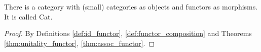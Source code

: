 \begin{theorem}
  There is a category with (small) categories as objects and functors as
  morphisms. It is called Cat.

  \begin{proof}
    By Definitions \ref{def:id_functor}, \ref{def:functor_composition} and Theorems \ref{thm:unitality_functor}, \ref{thm:assoc_functor}.
  \end{proof}
\end{theorem}